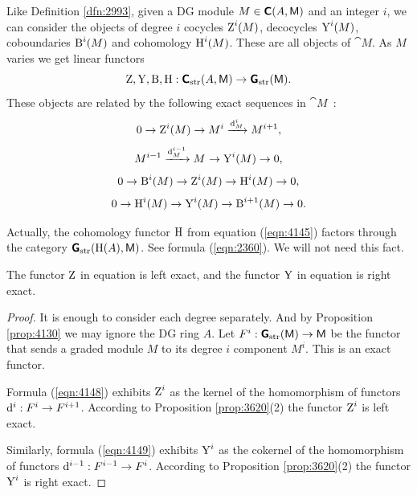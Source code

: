 Like Definition \ref{dfn:2993}, given a DG module 
$M \in \boldsymbol{\mathsf{C}}(A, \operatorname{\mathsf{M}})$ and an 
integer $i$, we can consider the objects of degree $i$ cocycles 
$\operatorname{Z}^i(M)$,  decocycles $\operatorname{Y}^i(M)$, coboundaries $\operatorname{B}^i(M)$ and 
cohomology $\operatorname{H}^i(M)$. These are all objects of $\cat{M}$. As $M$ varies we 
get linear functors 
\begin{equation} \label{eqn:4145}
\operatorname{Z}, \operatorname{Y}, \operatorname{B}, \operatorname{H} : \boldsymbol{\mathsf{C}}_{\mathrm{str}}(A, \operatorname{\mathsf{M}}) \to 
\boldsymbol{\mathsf{G}}_{\mathrm{str}}(\operatorname{\mathsf{M}}) . 
\end{equation}
These objects are related by the following exact sequences in $\cat{M}$~:
\begin{equation} \label{eqn:4148}
0 \to \operatorname{Z}^i(M) \to M^i \xrightarrow{\mathrm{d}^i_M} M^{i + 1} , 
\end{equation}
\begin{equation} \label{eqn:4149}
M^{i - 1} \xrightarrow{\mathrm{d}^{i - 1}_M} M^{} \to \operatorname{Y}^i(M) \to 0 , 
\end{equation}
\begin{equation} \label{eqn:4146}
0 \to \operatorname{B}^i(M) \to \operatorname{Z}^i(M) \to \operatorname{H}^i(M) \to 0 , 
\end{equation}
\begin{equation} \label{eqn:4147}
0 \to \operatorname{H}^i(M) \to \operatorname{Y}^i(M) \to \operatorname{B}^{i + 1}(M) \to 0 . 
\end{equation}


\begin{rem} \label{rem:3980}
Actually, the cohomology functor $\operatorname{H}$ from equation (\ref{eqn:4145})
factors through the category $\boldsymbol{\mathsf{G}}_{\mathrm{str}}(\operatorname{H}(A),  \operatorname{\mathsf{M}})$. 
See formula (\ref{eqn:2360}). We will not need this fact. 
\end{rem}

\begin{prop} \label{prop:4145}
The functor $\operatorname{Z}$ in equation \tup{(\ref{eqn:4145})}
is left exact, and the functor
$\operatorname{Y}$ in equation \tup{(\ref{eqn:4145})}
is right exact.
\end{prop}

\begin{proof}
It is enough to consider each degree separately. And by Proposition 
\ref{prop:4130} we may ignore the DG ring $A$.
Let $F^i : \boldsymbol{\mathsf{G}}_{\mathrm{str}}(\operatorname{\mathsf{M}}) \to \operatorname{\mathsf{M}}$
be the functor that sends a graded module $M$ to its degree $i$ component 
$M^i$. This is an exact functor. 

Formula (\ref{eqn:4148}) exhibits $\operatorname{Z}^i$ as the kernel of the homomorphism 
of functors $\mathrm{d}^i : F^i \to F^{i + 1}$. According to Proposition 
\ref{prop:3620}(2) the functor $\operatorname{Z}^i$ is left exact. 

Similarly, formula (\ref{eqn:4149}) exhibits $\operatorname{Y}^i$ as the cokernel of the 
homomorphism of functors 
$\mathrm{d}^{i - 1} : F^{i - 1} \to F^{i}$. According to Proposition 
\ref{prop:3620}(2) the functor $\operatorname{Y}^i$ is right exact. 
\end{proof}

